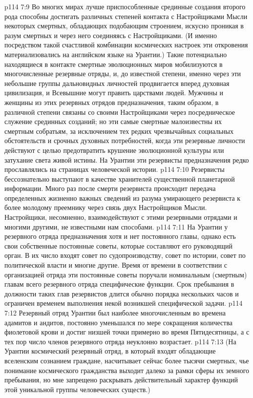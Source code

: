 \vs p114 7:9 Во многих мирах лучше приспособленные срединные создания второго рода способны достигать различных степеней контакта с Настройщиками Мысли некоторых смертных, обладающих подобающим строением, искусно проникая в разум смертных и через него соединяясь с Настройщиками. (И именно посредством такой счастливой комбинации космических настроек эти откровения материализовались на английском языке на Урантии.) Такие потенциально находящиеся в контакте смертные эволюционных миров мобилизуются в многочисленные резервные отряды, и, до известной степени, именно через эти небольшие группы дальновидных личностей продвигается вперед духовная цивилизация, и Всевышние могут править царствами людей. Мужчины и женщины из этих резервных отрядов предназначения, таким образом, в различной степени связаны со своими Настройщиками через посредническое служение срединных созданий; но эти самые смертные малоизвестны их смертным собратьям, за исключением тех редких чрезвычайных социальных обстоятельств и срочных духовных потребностей, когда эти резервные личности действуют с целью предотвратить крушение эволюционной культуры или затухание света живой истины. На Урантии эти резервисты предназначения редко прославлялись на страницах человеческой истории.
\vs p114 7:10 Резервисты бессознательно выступают в качестве хранителей существенной планетарной информации. Много раз после смерти резервиста происходит передача определенных жизненно важных сведений из разума умирающего резервиста к более молодому преемнику через связь двух Настройщиков Мысли. Настройщики, несомненно, взаимодействуют с этими резервными отрядами и многими другими, не известными нам способами.
\vs p114 7:11 На Урантии у резервного отряда предназначения хотя и нет постоянного главы, однако есть свои собственные постоянные советы, которые составляют его руководящий орган. В их число входят совет по судопроизводству, совет по истории, совет по политической власти и многие другие. Время от времени в соответствии с организацией отряда эти постоянные советы поручали номинальным (смертным) главам всего резервного отряда специфические функции. Срок пребывания в должности таких глав резервистов длится обычно порядка нескольких часов и ограничен временем выполнения некой возникшей специфической задачи.
\vs p114 7:12 Резервный отряд Урантии был наиболее многочисленным во времена адамитов и андитов, постоянно уменьшался по мере сокращения количества фиолетовой крови и достиг низшей точки примерно во время Пятидесятницы, а с тех пор число членов резервного отряда неуклонно возрастает.
\vs p114 7:13 \pc (На Урантии космический резервный отряд, в который входят обладающие вселенским сознанием граждане, насчитывает сейчас более тысячи смертных, чье понимание космического гражданства выходит далеко за рамки сферы их земного пребывания, но мне запрещено раскрывать действительный характер функций этой уникальной группы человеческих существ.)
